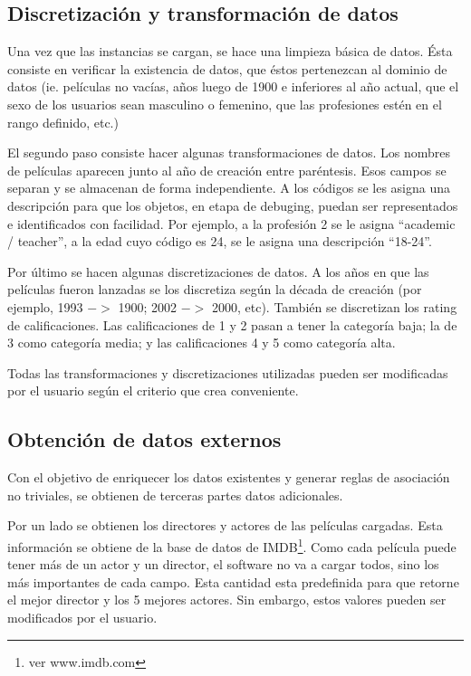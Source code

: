 \documentclass[journal]{IEEEtran}
\begin{document}
\subsection{Discretización y transformación de datos}
Una vez que las instancias se cargan, se hace una limpieza básica de datos.
Ésta consiste en verificar la existencia de datos, que éstos pertenezcan
al dominio de datos (ie. películas no vacías, años luego de 1900 e inferiores
al año actual, que el sexo de los usuarios sean masculino o femenino, que las
profesiones estén en el rango definido, etc.)

El segundo paso consiste hacer algunas transformaciones de datos. Los nombres
de películas aparecen junto al año de creación entre paréntesis. Esos campos se 
separan y se almacenan de forma independiente. A los códigos se les
asigna una descripción para que los objetos, en etapa de debuging, 
puedan ser representados e identificados con facilidad. Por ejemplo, a la profesión 2 se 
le asigna ``academic / teacher'', a la edad cuyo código es 24, se le asigna
una descripción ``18-24''.

Por último se hacen algunas discretizaciones de datos. A los años en que
las películas fueron lanzadas se los discretiza según la década de creación
 (por ejemplo, 1993 $-$$>$ 1900; 2002 $-$$>$ 2000, etc). 
También se discretizan los rating de calificaciones. Las calificaciones de
1 y 2 pasan a tener la categoría baja; la de 3 como categoría media; y las
calificaciones 4 y 5 como categoría alta. 

Todas las transformaciones y discretizaciones utilizadas pueden ser modificadas
por el usuario según el criterio que crea conveniente. 



\subsection{Obtención de datos externos}
Con el objetivo de enriquecer los datos existentes y generar reglas de asociación
no triviales, se obtienen de terceras partes datos adicionales.

Por un lado se obtienen los directores y actores de las películas cargadas. Esta información se
obtiene de la base de datos de IMDB\footnote{ver www.imdb.com}. Como cada película puede
tener más de un actor y un director, el software no va a cargar todos, sino los más importantes
de cada campo. Esta cantidad esta predefinida para que retorne el mejor director y los 
5 mejores actores. Sin embargo, estos valores pueden ser modificados por el usuario.
\end{document}
